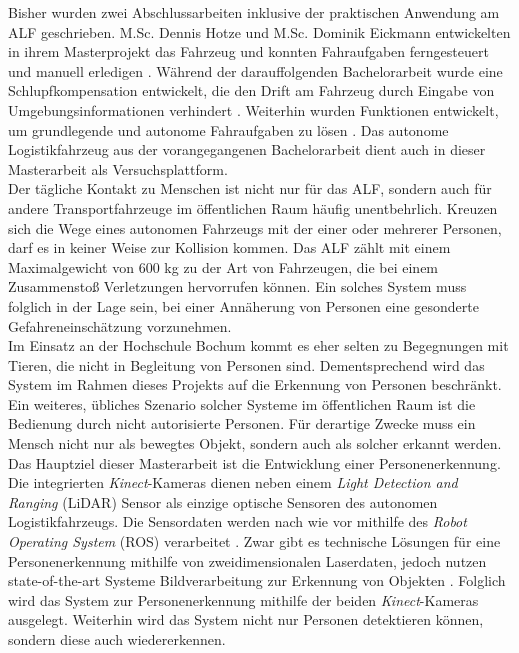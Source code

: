 		Bisher wurden zwei Abschlussarbeiten inklusive der praktischen Anwendung am ALF geschrieben. M.Sc. Dennis Hotze und M.Sc. Dominik Eickmann entwickelten in ihrem Masterprojekt das Fahrzeug und konnten Fahraufgaben ferngesteuert und manuell erledigen \cite{alf}. Während der darauffolgenden Bachelorarbeit wurde eine Schlupfkompensation entwickelt, die den Drift am Fahrzeug durch Eingabe von Umgebungsinformationen verhindert \cite{Bachelorarbeit}. Weiterhin wurden Funktionen entwickelt, um grundlegende und autonome Fahraufgaben zu lösen \cite{Bachelorarbeit}. Das autonome Logistikfahrzeug aus der vorangegangenen Bachelorarbeit dient auch in dieser Masterarbeit als Versuchsplattform.\\
		
		Der tägliche Kontakt zu Menschen ist nicht nur für das ALF, sondern auch für andere Transportfahrzeuge im öffentlichen Raum häufig unentbehrlich. Kreuzen sich die Wege eines autonomen Fahrzeugs mit der einer oder mehrerer Personen, darf es in keiner Weise zur Kollision kommen. Das ALF zählt mit einem Maximalgewicht von 600 kg zu der Art von Fahrzeugen, die bei einem Zusammenstoß Verletzungen hervorrufen können. Ein solches System muss folglich in der Lage sein, bei einer Annäherung von Personen eine gesonderte Gefahreneinschätzung vorzunehmen.\\
		
		Im Einsatz an der Hochschule Bochum kommt es eher selten zu Begegnungen mit Tieren, die nicht in Begleitung von Personen sind. Dementsprechend wird das System im Rahmen dieses Projekts auf die Erkennung von Personen beschränkt. Ein weiteres, übliches Szenario solcher Systeme im öffentlichen Raum ist die Bedienung durch nicht autorisierte Personen. Für derartige Zwecke muss ein Mensch nicht nur als bewegtes Objekt, sondern auch als solcher erkannt werden. \\
		
		Das Hauptziel dieser Masterarbeit ist die Entwicklung einer Personenerkennung. Die integrierten \textit{Kinect}-Kameras dienen neben einem \textit{Light Detection and Ranging} (LiDAR) Sensor als einzige optische Sensoren des autonomen Logistikfahrzeugs. Die Sensordaten werden nach wie vor mithilfe des \textit{Robot Operating System} (ROS) verarbeitet \cite{Bachelorarbeit}. Zwar gibt es technische Lösungen für eine Personenerkennung mithilfe von zweidimensionalen Laserdaten, jedoch nutzen state-of-the-art Systeme Bildverarbeitung zur Erkennung von Objekten \cite{mobilenets, hogsvm}. Folglich wird das System zur Personenerkennung mithilfe der beiden \textit{Kinect}-Kameras ausgelegt. Weiterhin wird das System nicht nur Personen detektieren können, sondern diese auch wiedererkennen. \\
		
